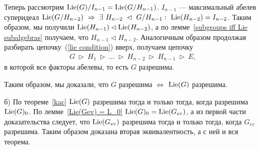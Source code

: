 \begin{theorem}
{\begin{trivlist}
        Теперь рассмотрим $ \mathrm{Lie}(G) / I_{n-1} = \mathrm{Lie}(G/H_{n-1}) $. $ I_{n-1} $ ---
        максимальный абелев суперидеал $ \mathrm{Lie}(G/H_{n-2}) ~\Rightarrow
        ~\exists ~H_{n-2} ~\lhd ~G/H_{n-1}: ~\mathrm{Lie}(H_{n-2}) = I_{n-2} $.
        Таким образом, мы получили $ \mathrm{Lie}(H_{n-1}) \lhd \mathrm{Lie}(H_{n-2}) $,
        а по лемме~\ref{subgroups iff Lie subalgebras} получаем, что $ H_{n-1} \lhd H_{n-2} $.
        Аналогичным образом продолжая разбирать цепочку~(\ref{lie condition}) вверх, получаем цепочку
        \begin{align*}
          G ~\rhd ~H_1 ~\rhd ~\ldots ~\rhd ~H_{n-2} ~\rhd ~H_{n-1} ~\rhd ~E,
        \end{align*}
        в которой все факторы абелевы, то есть $ G $ разрешима.

        Таким образом, мы доказали, что $ G $ разрешима $ \iff $ $ \mathrm{Lie}(G)$ разрешима.

      \item б) По теореме~\ref{kac} $ \mathrm{Lie}(G) $ разрешима тогда и только тогда,
        когда разрешима $ \mathrm{Lie}(G)_0 $. По лемме~\ref{Lie(Gev) = L_0} $ \mathrm{Lie}(G)_0 = \mathrm{Lie}(G_{ev}) $,
        а из первой части доказательства следует, что $ \mathrm{Lie}(G_{ev}) $ разрешима
        тогда и только тогда, когда $ G_{ev} $ разрешима.
        Таким образом доказана вторая эквивалентность, а с ней и вся теорема.
        \qedhere
    \end{trivlist}
  }
\end{theorem}
